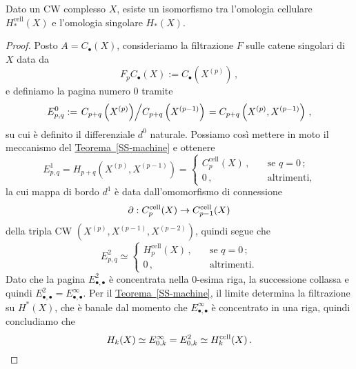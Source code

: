 \begin{prop}\label{h-cell}
	Dato un CW complesso $X$, esiste un isomorfismo tra
	l'omologia cellulare $H^{\mathrm{cell}}_{*}(X)$
	e l'omologia singolare $H_{*}(X)$.
	\begin{proof}
	Posto $A=C_{\bullet}(X)$, consideriamo la filtrazione $F$ 
	sulle catene singolari di $X$ data da
	\begin{equation*}
		F_{p}C_{\bullet}(X) := C_{\bullet} \left( X^{(p)} \right)\,,
	\end{equation*}
	e definiamo la pagina numero $0$ tramite
	\begin{equation*}
		E^{0}_{p,q} := \left. C_{p+q}\left( X^{(p)} \right) \middle/ C_{p+q}\left( X^{(p-1)} \right)
		 \right. 
		 = C_{p+q}\left( X^{(p)}, X^{(p-1)} \right)\,,
	\end{equation*}
	su cui è definito il differenziale $d^{0}$ naturale. 
	Possiamo così mettere in moto il meccanismo del 
	\hyperref[SS-machine]{Teorema~\ref{SS-machine}} e ottenere
	\begin{equation*}
		E^{1}_{p,q} = H_{p+q}\left( X^{(p)}, X^{(p-1)} \right) =
		\begin{cases}
			C_{p}^{\mathrm{cell}}(X)\,, \quad &\text{se } q = 0\,; \\
			0\,, \quad &\text{altrimenti,}
		\end{cases}
	\end{equation*}
	la cui mappa di bordo $d^{1}$ è data dall'omomorfismo di connessione
	$$\partial : C_{p}^{\mathrm{cell}}(X) \to C_{p-1}^{\mathrm{cell}}(X)$$
	della tripla CW $\left( X^{(p)}, X^{(p-1)}, X^{(p-2)}\right)$,
	quindi segue che
	\begin{equation*}
		E_{p,q}^{2} \simeq 
		\begin{cases}
			H^{\mathrm{cell}}_{p}(X)\,, \quad &\text{se } q=0\,; \\
			0\,, \quad &\text{altrimenti}.		
		\end{cases}
	\end{equation*}
	Dato che la pagina $E_{\bullet, \bullet}^{2}$ è concentrata
	nella $0$-esima riga, la successione collassa e quindi 
	$E_{\bullet,\bullet}^{2} = E_{\bullet,\bullet}^{\infty}$.
	Per il \hyperref[SS-machine]{Teorema~\ref{SS-machine}},
	il limite determina la filtrazione su $H^{*}(X)$,
	che è banale dal momento che $E_{\bullet,\bullet}^{\infty}$ 
	è concentrato in una riga, quindi concludiamo che
	\begin{equation*}
		H_{k}(X) \simeq  E_{0,k}^{\infty} = E_{0,k}^{2} \simeq H^{\mathrm{cell}}_{k}(X)\,.
		\qedhere
	\end{equation*}
	

\end{proof}
\end{prop}
